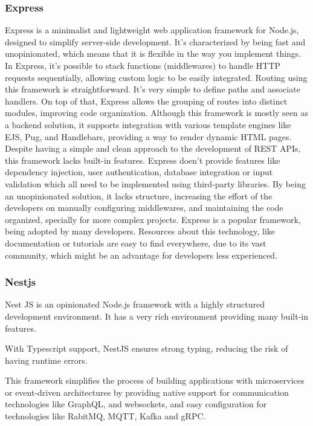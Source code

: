 \subsubsection{Express}
Express is a minimalist and lightweight web application framework for Node.js,
designed to simplify server-side development. It's characterized by being
fast and unopinionated, which means that it is flexible in the way you implement
things.
In Express, it's possible to stack functions (middlewares) to handle \gls{HTTP}
requests sequentially, allowing custom logic to be easily integrated.
Routing using this framework is straightforward. It's very simple to define
paths and associate handlers. On top of that, Express allows the grouping of
routes into distinct modules, improving code organization.
Although this framework is mostly seen as a backend solution, it supports
integration with various template engines like \gls{EJS}, Pug, and Handlebars,
providing a way to render dynamic \gls{HTML} pages.
Despite having a simple and clean approach to the development of \gls{REST} \gls{API}s,
this framework lacks built-in features. Express doen't provide features like
dependency injection, user authentication, database integration or input
validation which all need to be implemented using third-party libraries.
By being an unopinionated solution, it lacks structure, increasing the effort
of the developers on manually configuring middlewares, and maintaining the code
organized, specially for more complex projects.
Express is a popular framework, being adopted by many developers. Resources
about this technology, like documentation or tutorials are easy to find
everywhere, due to its vast community, which might be an advantage for
developers less experienced.

\subsubsection{Nestjs}
Nest JS is an opinionated Node.js framework with a highly structured
development environment. It has a very rich environment providing many built-in
features.

With Typescript support, NestJS ensures strong typing, reducing the risk of
having runtime errors.

This framework simplifies the process of building applications with
microservices or event-driven architectures by providing native support for
communication technologies like GraphQL, and websockets, and easy configuration
for technologies like RabitMQ, \gls{MQTT}, Kafka and \gls{gRPC}.


